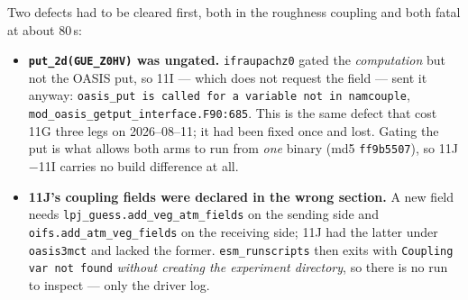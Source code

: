 \documentclass[10pt]{article}
\begin{document}
Two defects had to be cleared first, both in the roughness coupling and both fatal at
about $80$\,s:
\begin{itemize}\itemsep2pt
\item \textbf{\texttt{put\_2d(GUE\_Z0HV)} was ungated.} \texttt{ifraupachz0} gated the
\emph{computation} but not the OASIS put, so 11I --- which does not request the field ---
sent it anyway: \texttt{oasis\_put is called for a variable not in namcouple},
\texttt{mod\_oasis\_getput\_interface.F90:685}. This is the same defect that cost 11G three
legs on 2026--08--11; it had been fixed once and lost. Gating the put is what allows both
arms to run from \emph{one} binary (md5 \texttt{ff9b5507}), so 11J${-}$11I carries no build
difference at all.
\item \textbf{11J's coupling fields were declared in the wrong section.} A new field needs
\texttt{lpj\_guess.add\_veg\_atm\_fields} on the sending side and
\texttt{oifs.add\_atm\_veg\_fields} on the receiving side; 11J had the latter under
\texttt{oasis3mct} and lacked the former. \texttt{esm\_runscripts} then exits with
\texttt{Coupling var not found} \emph{without creating the experiment directory}, so there
is no run to inspect --- only the driver log.
\end{itemize}
\end{document}
